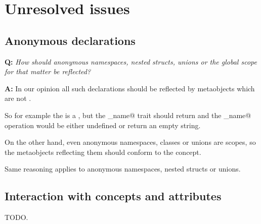 \section{Unresolved issues}

\subsection{Anonymous declarations}

\textbf{Q:} {\em How should anonymous namespaces, nested structs, unions or
the global scope for that matter be reflected?}

\textbf{A:} In our opinion all such declarations should be reflected by
metaobjects which are not .

So for example the  is a , but
the \verb@has_name@ trait should return \verb@false@ and the \verb@get_name@
operation would be either undefined or return an empty string.

On the other hand, even anonymous namespaces, classes or unions are scopes,
so the metaobjects reflecting them should conform to the  concept.

Same reasoning applies to anonymous namespaces, nested structs or unions.

\subsection{Interaction with concepts and attributes}

TODO.

